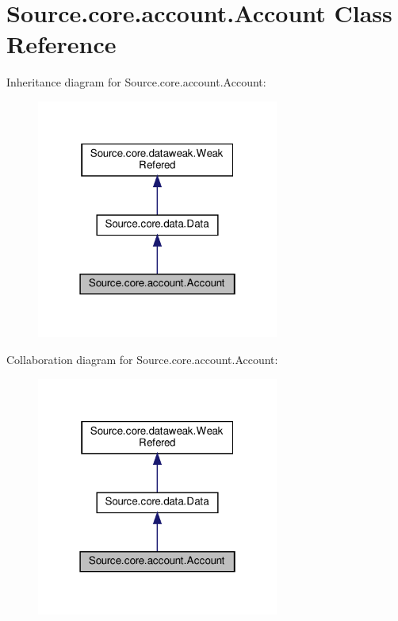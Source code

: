 \hypertarget{classSource_1_1core_1_1account_1_1Account}{}\section{Source.\+core.\+account.\+Account Class Reference}
\label{classSource_1_1core_1_1account_1_1Account}


Inheritance diagram for Source.\+core.\+account.\+Account\+:\nopagebreak
\begin{figure}[H]
\begin{center}
\leavevmode
\includegraphics[width=226pt]{classSource_1_1core_1_1account_1_1Account__inherit__graph}
\end{center}
\end{figure}


Collaboration diagram for Source.\+core.\+account.\+Account\+:\nopagebreak
\begin{figure}[H]
\begin{center}
\leavevmode
\includegraphics[width=226pt]{classSource_1_1core_1_1account_1_1Account__coll__graph}
\end{center}
\end{figure}
